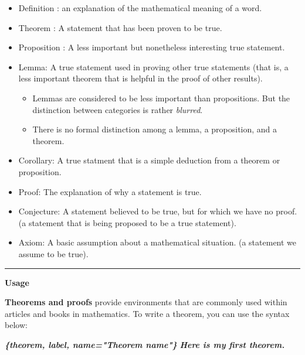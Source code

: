 \documentclass[
  a4paper,
  twoside,
  openright]{book}
\newenvironment{Shaded}{\begin{snugshade}}{\end{snugshade}}
\newcommand{\InformationTok}[1]{\textcolor[rgb]{0.56,0.35,0.01}{\textbf{\textit{#1}}}}
\providecommand{\tightlist}{%
  \setlength{\itemsep}{0pt}\setlength{\parskip}{0pt}}
\theoremstyle{definition}
\theoremstyle{definition}
\theoremstyle{definition}
\theoremstyle{definition}
\theoremstyle{remark}
\begin{document}
\begin{itemize}
\tightlist
\item
  Definition : an explanation of the mathematical meaning of a word.
\item
  Theorem : A statement that has been proven to be true.
\item
  Proposition : A less important but nonetheless interesting true statement.
\item
  Lemma: A true statement used in proving other true statements (that is, a less important theorem that is helpful in the proof of other results).

  \begin{itemize}
  \tightlist
  \item
    Lemmas are considered to be less important than propositions. But the distinction between categories is rather \emph{blurred}.
  \item
    There is no formal distinction among a lemma, a proposition, and a theorem.
  \end{itemize}
\item
  Corollary: A true statment that is a simple deduction from a theorem or proposition.
\item
  Proof: The explanation of why a statement is true.
\item
  Conjecture: A statement believed to be true, but for which we have no proof. (a statement that is being proposed to be a true statement).
\item
  Axiom: A basic assumption about a mathematical situation. (a statement we assume to be true).
\end{itemize}

\begin{center}\rule{0.5\linewidth}{0.5pt}\end{center}

\textbf{Usage}

\textbf{Theorems and proofs} provide environments that are commonly used within articles and books in mathematics. To write a theorem, you can use the syntax below:

\begin{Shaded}
\begin{Highlighting}[]
\InformationTok{\textasciigrave{}\textasciigrave{}\textasciigrave{}\{theorem, label, name="Theorem name"\}}
\InformationTok{Here is my first theorem.}
\InformationTok{\textasciigrave{}\textasciigrave{}\textasciigrave{}}
\end{Highlighting}
\end{Shaded}
\end{document}
